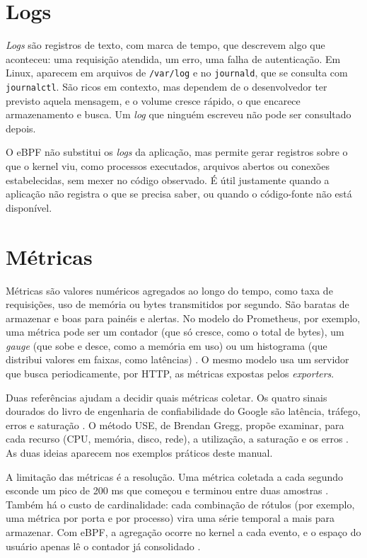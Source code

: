 \section{Logs}

\textit{Logs} são registros de texto, com marca de tempo, que descrevem algo que aconteceu: uma requisição atendida, um erro, uma falha de autenticação. Em Linux, aparecem em arquivos de \texttt{/var/log} e no \texttt{journald}, que se consulta com \texttt{journalctl}. São ricos em contexto, mas dependem de o desenvolvedor ter previsto aquela mensagem, e o volume cresce rápido, o que encarece armazenamento e busca. Um \textit{log} que ninguém escreveu não pode ser consultado depois.

O eBPF não substitui os \textit{logs} da aplicação, mas permite gerar registros sobre o que o kernel viu, como processos executados, arquivos abertos ou conexões estabelecidas, sem mexer no código observado. É útil justamente quando a aplicação não registra o que se precisa saber, ou quando o código-fonte não está disponível.

\section{Métricas}

Métricas são valores numéricos agregados ao longo do tempo, como taxa de requisições, uso de memória ou bytes transmitidos por segundo. São baratas de armazenar e boas para painéis e alertas. No modelo do Prometheus, por exemplo, uma métrica pode ser um contador (que só cresce, como o total de bytes), um \textit{gauge} (que sobe e desce, como a memória em uso) ou um histograma (que distribui valores em faixas, como latências) \cite{turnbull2018}. O mesmo modelo usa um servidor que busca periodicamente, por HTTP, as métricas expostas pelos \textit{exporters}.

Duas referências ajudam a decidir quais métricas coletar. Os quatro sinais dourados do livro de engenharia de confiabilidade do Google são latência, tráfego, erros e saturação \cite{beyer2016}. O método USE, de Brendan Gregg, propõe examinar, para cada recurso (CPU, memória, disco, rede), a utilização, a saturação e os erros \cite{gregg2020}. As duas ideias aparecem nos exemplos práticos deste manual.

A limitação das métricas é a resolução. Uma métrica coletada a cada segundo esconde um pico de 200 ms que começou e terminou entre duas amostras \cite{research2024}. Também há o custo de cardinalidade: cada combinação de rótulos (por exemplo, uma métrica por porta e por processo) vira uma série temporal a mais para armazenar. Com eBPF, a agregação ocorre no kernel a cada evento, e o espaço do usuário apenas lê o contador já consolidado \cite{gregg2019}.

